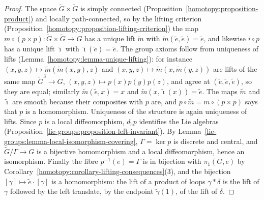 \begin{proof}
The space $\widetilde{G} \times \widetilde{G}$ is simply connected (Proposition~\ref{homotopy:proposition-product}) and locally path-connected, so by the lifting
criterion (Proposition~\ref{homotopy:proposition-lifting-criterion}) the map $m \circ (p \times p) \colon \widetilde{G} \times \widetilde{G} \to G$ has a unique lift
$\widetilde{m}$ with $\widetilde{m}(\widetilde{e}, \widetilde{e}) = \widetilde{e}$, and likewise $i \circ p$ has a unique lift $\widetilde{\imath}$ with
$\widetilde{\imath}(\widetilde{e}) = \widetilde{e}$. The group axioms follow from uniqueness of lifts (Lemma~\ref{homotopy:lemma-unique-lifting}): for instance
$(x, y, z) \mapsto \widetilde{m}(\widetilde{m}(x, y), z)$ and $(x, y, z) \mapsto \widetilde{m}(x, \widetilde{m}(y, z))$ are lifts of the same map
$\widetilde{G}^3 \to G$, $(x, y, z) \mapsto p(x)p(y)p(z)$, and agree at $(\widetilde{e}, \widetilde{e}, \widetilde{e})$, so they are equal; similarly
$\widetilde{m}(\widetilde{e}, x) = x$ and $\widetilde{m}(x, \widetilde{\imath}(x)) = \widetilde{e}$. The maps $\widetilde{m}$ and $\widetilde{\imath}$ are smooth because their composites with
$p$ are, and $p \circ \widetilde{m} = m \circ (p \times p)$ says that $p$ is a homomorphism. Uniqueness of the structure is again uniqueness of lifts. Since $p$ is a
local diffeomorphism, $d_{\widetilde{e}}p$ identifies the Lie algebras (Proposition~\ref{lie-groups:proposition-left-invariant}). By
Lemma~\ref{lie-groups:lemma-local-isomorphism-covering}, $\Gamma = \ker p$ is discrete and central, and $\widetilde{G}/\Gamma \to G$ is a bijective homomorphism and a
local diffeomorphism, hence an isomorphism. Finally the fibre $p^{-1}(e) = \Gamma$ is in bijection with $\pi_1(G, e)$ by
Corollary~\ref{homotopy:corollary-lifting-consequences}(3), and the bijection $[\gamma] \mapsto \widetilde{e} \cdot [\gamma]$ is a homomorphism: the lift of a product of loops
$\gamma * \delta$ is the lift of $\gamma$ followed by the left translate, by the endpoint $\widetilde{\gamma}(1)$, of the lift of $\delta$.
\end{proof}


